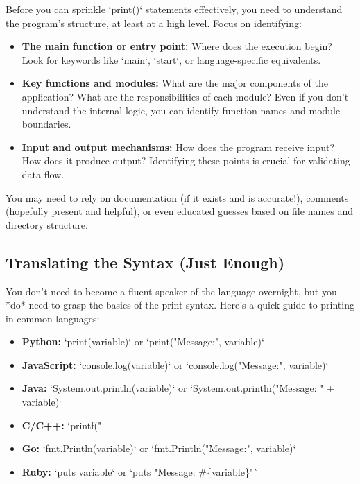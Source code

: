 \documentclass{article}
\begin{document}
{{{{Before you can sprinkle `print()` statements effectively, you need to understand the program's structure, at least at a high level. Focus on identifying:

\begin{itemize}
    \item \textbf{The main function or entry point:} Where does the execution begin? Look for keywords like `main`, `start`, or language-specific equivalents.
    \item \textbf{Key functions and modules:} What are the major components of the application? What are the responsibilities of each module? Even if you don't understand the internal logic, you can identify function names and module boundaries.
    \item \textbf{Input and output mechanisms:} How does the program receive input? How does it produce output?  Identifying these points is crucial for validating data flow.
\end{itemize}

You may need to rely on documentation (if it exists and is accurate!), comments (hopefully present and helpful), or even educated guesses based on file names and directory structure.

\subsection*{Translating the Syntax (Just Enough)}

You don't need to become a fluent speaker of the language overnight, but you *do* need to grasp the basics of the print syntax. Here's a quick guide to printing in common languages:

\begin{itemize}
    \item \textbf{Python:} `print(variable)` or `print("Message:", variable)`
    \item \textbf{JavaScript:} `console.log(variable)` or `console.log("Message:", variable)`
    \item \textbf{Java:} `System.out.println(variable)` or `System.out.println("Message: " + variable)`
    \item \textbf{C/C++:} `printf("%
    \item \textbf{Go:} `fmt.Println(variable)` or `fmt.Println("Message:", variable)`
    \item \textbf{Ruby:} `puts variable` or `puts "Message: \#\{variable\}"`
\end{itemize}

}}}}
\end{document}
